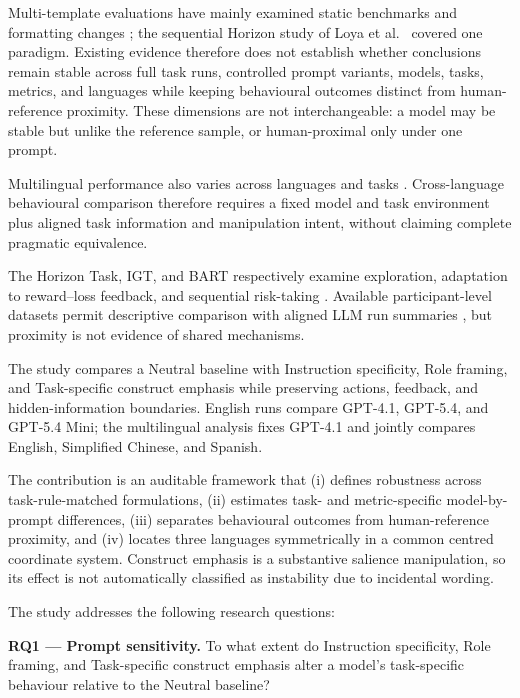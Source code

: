 \documentclass[logo,msc,inf]{infthesis}       %
\begin{document}
Multi-template evaluations have mainly examined static benchmarks and formatting changes \cite{Sclar2024PromptFormatting}; the sequential Horizon study of Loya et al.~\cite{Loya2023PromptSensitivityDecision} covered one paradigm. Existing evidence therefore does not establish whether conclusions remain stable across full task runs, controlled prompt variants, models, tasks, metrics, and languages while keeping behavioural outcomes distinct from human-reference proximity. These dimensions are not interchangeable: a model may be stable but unlike the reference sample, or human-proximal only under one prompt.

Multilingual performance also varies across languages and tasks \cite{Ahuja2023MEGA}. Cross-language behavioural comparison therefore requires a fixed model and task environment plus aligned task information and manipulation intent, without claiming complete pragmatic equivalence.

The Horizon Task, IGT, and BART respectively examine exploration, adaptation to reward--loss feedback, and sequential risk-taking \cite{Wilson2014,Bechara1994,Lejuez2002}. Available participant-level datasets permit descriptive comparison with aligned LLM run summaries \cite{Feng2021ExploreExploit,Steingroever2015IGTData,Sebri2023BART}, but proximity is not evidence of shared mechanisms.

The study compares a Neutral baseline with Instruction specificity, Role framing, and Task-specific construct emphasis while preserving actions, feedback, and hidden-information boundaries. English runs compare GPT-4.1, GPT-5.4, and GPT-5.4 Mini; the multilingual analysis fixes GPT-4.1 and jointly compares English, Simplified Chinese, and Spanish.

The contribution is an auditable framework that (i) defines robustness across task-rule-matched formulations, (ii) estimates task- and metric-specific model-by-prompt differences, (iii) separates behavioural outcomes from human-reference proximity, and (iv) locates three languages symmetrically in a common centred coordinate system. Construct emphasis is a substantive salience manipulation, so its effect is not automatically classified as instability due to incidental wording.

The study addresses the following research questions:

\noindent\textbf{RQ1 --- Prompt sensitivity.}
To what extent do Instruction specificity, Role framing, and Task-specific construct emphasis alter a model's task-specific behaviour relative to the Neutral baseline?
\end{document}
